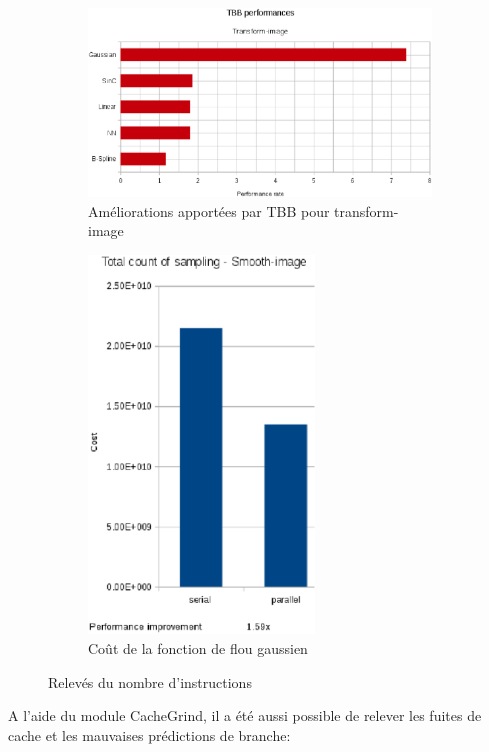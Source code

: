 \documentclass[10pt]{report}
\begin{document}
\begin{figure}[h!]
	\centering
	\begin{subfigure}{\textwidth}
		\centering
		\includegraphics[width=12.5cm]{Reports/figures/performances_tbb_transform_image.eps}
		\caption{Améliorations apportées par TBB pour transform-image}
		\label{Améliorations apportées par TBB pour transform-image}
		\vspace{0.1cm}
	\end{subfigure}
	\begin{subfigure}{\textwidth}
		\centering
		\includegraphics[width=6cm]{Reports/figures/smooth_image_costs.eps}
		\caption{Coût de la fonction de flou gaussien}
		\label{Coût de la fonction de flou gaussien}
	\end{subfigure}
	\caption{Relevés du nombre d'instructions}
	\label{Relevés du nombre d'instructions}
\end{figure}

A l'aide du module CacheGrind, il a été aussi possible de relever les fuites de cache et les mauvaises prédictions de branche:
\end{document}
